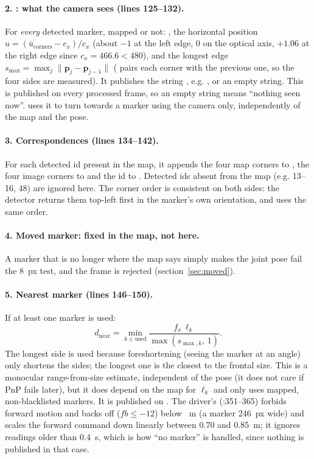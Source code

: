 \paragraph{2. : what the camera sees (lines 125--132).} For \emph{every} detected marker, mapped or
not: , the horizontal position $u = (\bar u_{\text{corners}} - c_x)/c_x$ (about $-1$ at the left
edge, $0$ on the optical axis, $+1.06$ at the right edge since $c_x=466.6<480$), and the longest edge
$s_{\max}=\max_j\lVert \mathbf p_j-\mathbf p_{j-1}\rVert$ ( pairs each corner with the previous one, so
the four sides are measured). It publishes the string , e.g. ,
or an empty string. This is published on every processed frame, so an empty string means ``nothing seen now''.
 uses it to turn towards a marker using the camera only, independently of the map and the pose.

\paragraph{3. Correspondences (lines 134--142).} For each detected id present in the map, it appends the four map corners  to , the four
image corners to  and the id to . Detected ids absent from the map (e.g. 13--16, 48) are
ignored here. The corner order is consistent on both sides: the detector returns them top-left first in the marker's
own orientation, and  uses the same order.

\paragraph{4. Moved marker: fixed in the map, not here.} A marker that is no longer where the map says simply
makes the joint pose fail the 8~px test, and the frame is rejected (section~\ref{sec:moved}).

\paragraph{5. Nearest marker (lines 146--150).}\label{sec:nearest} If at least one marker is used:
\begin{equation}
d_{\text{near}} = \min_{k\in\text{used}} \frac{f_x\,\ell_k}{\max(s_{\max,k},\,1)} .
\end{equation}
The longest side is used because foreshortening (seeing the marker at an angle) only shortens the sides; the longest
one is the closest to the frontal size. This is a monocular range-from-size estimate, independent of the pose (it
does not care if PnP fails later), but it does depend on the map for $\ell_k$ and only uses mapped, non-blacklisted
markers. It is published on . The driver's  (:351--365)
forbids forward motion and backs off ($fb\leq -12$) below ~m (a marker 246~px wide) and scales
the forward command down linearly between 0.70 and 0.85~m; it ignores readings older than 0.4~s, which is how ``no
marker'' is handled, since nothing is published in that case.

